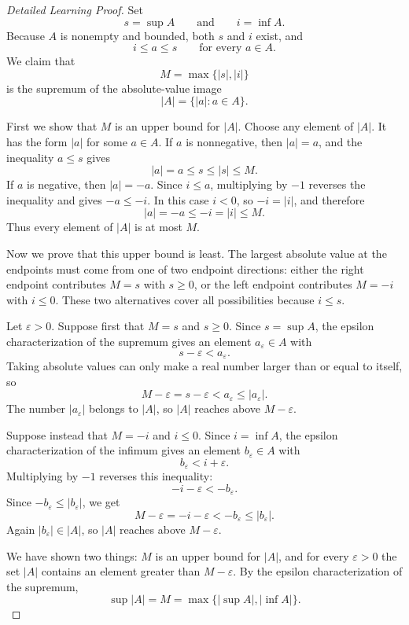 \begin{proof}[Detailed Learning Proof]
\LRAProofBodyStart
Set
\[
  s=\sup A
  \qquad\text{and}\qquad
  i=\inf A.
\]
Because $A$ is nonempty and bounded, both $s$ and $i$ exist, and
\[
  i\le a\le s
  \qquad\text{for every }a\in A.
\]
We claim that
\[
  M=\max\{|s|,|i|\}
\]
is the supremum of the absolute-value image
\[
  |A|=\{|a|:a\in A\}.
\]

First we show that $M$ is an upper bound for $|A|$. Choose any element of
$|A|$. It has the form $|a|$ for some $a\in A$. If $a$ is nonnegative, then
$|a|=a$, and the inequality $a\le s$ gives
\[
  |a|=a\le s\le |s|\le M.
\]
If $a$ is negative, then $|a|=-a$. Since $i\le a$, multiplying by $-1$
reverses the inequality and gives $-a\le -i$. In this case $i<0$, so
$-i=|i|$, and therefore
\[
  |a|=-a\le -i=|i|\le M.
\]
Thus every element of $|A|$ is at most $M$.

Now we prove that this upper bound is least. The largest absolute value at the
endpoints must come from one of two endpoint directions: either the right
endpoint contributes $M=s$ with $s\ge 0$, or the left endpoint contributes
$M=-i$ with $i\le 0$. These two alternatives cover all possibilities because
$i\le s$.

Let $\varepsilon>0$. Suppose first that $M=s$ and $s\ge 0$. Since
$s=\sup A$, the epsilon characterization of the supremum gives an element
$a_\varepsilon\in A$ with
\[
  s-\varepsilon<a_\varepsilon.
\]
Taking absolute values can only make a real number larger than or equal to
itself, so
\[
  M-\varepsilon=s-\varepsilon<a_\varepsilon\le |a_\varepsilon|.
\]
The number $|a_\varepsilon|$ belongs to $|A|$, so $|A|$ reaches above
$M-\varepsilon$.

Suppose instead that $M=-i$ and $i\le 0$. Since $i=\inf A$, the epsilon
characterization of the infimum gives an element $b_\varepsilon\in A$ with
\[
  b_\varepsilon<i+\varepsilon.
\]
Multiplying by $-1$ reverses this inequality:
\[
  -i-\varepsilon<-b_\varepsilon.
\]
Since $-b_\varepsilon\le |b_\varepsilon|$, we get
\[
  M-\varepsilon=-i-\varepsilon<-b_\varepsilon\le |b_\varepsilon|.
\]
Again $|b_\varepsilon|\in |A|$, so $|A|$ reaches above $M-\varepsilon$.

We have shown two things: $M$ is an upper bound for $|A|$, and for every
$\varepsilon>0$ the set $|A|$ contains an element greater than
$M-\varepsilon$. By the epsilon characterization of the supremum,
\[
  \sup |A|=M=\max\{|\sup A|,|\inf A|\}.
\]
\end{proof}

